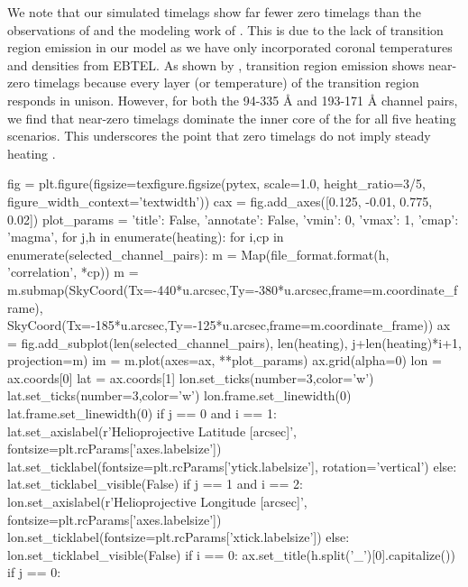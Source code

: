 We note that our simulated timelags show far fewer zero timelags than the observations of \citet{viall_evidence_2012,viall_survey_2017} and the modeling work of \citet{bradshaw_patterns_2016}. This is due to the lack of transition region emission in our model as we have only incorporated coronal temperatures and densities from EBTEL. As shown by \citet{viall_transition_2015}, transition region emission shows near-zero timelags because every layer (or temperature) of the transition region responds in unison. However, for both the 94-335 \AA{} and 193-171 \AA{} channel pairs, we find that near-zero timelags dominate the inner core of the \AR{} for all five heating scenarios. This underscores the point that zero timelags do not imply steady heating \citep[see][]{viall_transition_2015,viall_signatures_2016}.

\begin{pycode}
fig = plt.figure(figsize=texfigure.figsize(pytex, scale=1.0, height_ratio=3/5,
                                           figure_width_context='textwidth'))
cax = fig.add_axes([0.125, -0.01, 0.775, 0.02])
plot_params = {'title': False, 'annotate': False, 'vmin': 0, 'vmax': 1, 'cmap': 'magma',}
for j,h in enumerate(heating):
    for i,cp in enumerate(selected_channel_pairs):
        m = Map(file_format.format(h, 'correlation', *cp))
        m = m.submap(SkyCoord(Tx=-440*u.arcsec,Ty=-380*u.arcsec,frame=m.coordinate_frame),
                     SkyCoord(Tx=-185*u.arcsec,Ty=-125*u.arcsec,frame=m.coordinate_frame))
        ax = fig.add_subplot(len(selected_channel_pairs), len(heating), j+len(heating)*i+1,
                             projection=m)
        im = m.plot(axes=ax, **plot_params)
        ax.grid(alpha=0)
        lon = ax.coords[0]
        lat = ax.coords[1]
        lon.set_ticks(number=3,color='w')
        lat.set_ticks(number=3,color='w')
        lon.frame.set_linewidth(0)
        lat.frame.set_linewidth(0)
        if j == 0 and i == 1:
            lat.set_axislabel(r'Helioprojective Latitude [arcsec]', fontsize=plt.rcParams['axes.labelsize'])
            lat.set_ticklabel(fontsize=plt.rcParams['ytick.labelsize'], rotation='vertical')
        else:
            lat.set_ticklabel_visible(False)
        if j == 1 and i == 2:
            lon.set_axislabel(r'Helioprojective Longitude [arcsec]', fontsize=plt.rcParams['axes.labelsize'])
            lon.set_ticklabel(fontsize=plt.rcParams['xtick.labelsize'])
        else:
            lon.set_ticklabel_visible(False)
        if i == 0:
            ax.set_title(h.split('_')[0].capitalize())
        if j == 0:

\end{pycode}
